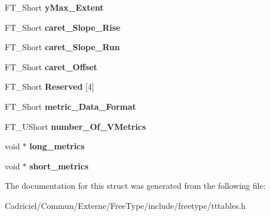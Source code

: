 \begin{DoxyCompactItemize}
\item 
F\+T\+\_\+\+Short {\bfseries y\+Max\+\_\+\+Extent}\hypertarget{struct_t_t___vert_header___af6927e95c1dfbe90c2e76b1eef521d53}{}\label{struct_t_t___vert_header___af6927e95c1dfbe90c2e76b1eef521d53}

\item 
F\+T\+\_\+\+Short {\bfseries caret\+\_\+\+Slope\+\_\+\+Rise}\hypertarget{struct_t_t___vert_header___a3218533a7d8ac5a8ebd70a970cbdbbcc}{}\label{struct_t_t___vert_header___a3218533a7d8ac5a8ebd70a970cbdbbcc}

\item 
F\+T\+\_\+\+Short {\bfseries caret\+\_\+\+Slope\+\_\+\+Run}\hypertarget{struct_t_t___vert_header___a98ff91b532d827440f7140d3071d473d}{}\label{struct_t_t___vert_header___a98ff91b532d827440f7140d3071d473d}

\item 
F\+T\+\_\+\+Short {\bfseries caret\+\_\+\+Offset}\hypertarget{struct_t_t___vert_header___a89ff9369f61dc5b770cde0eda954d402}{}\label{struct_t_t___vert_header___a89ff9369f61dc5b770cde0eda954d402}

\item 
F\+T\+\_\+\+Short {\bfseries Reserved} \mbox{[}4\mbox{]}\hypertarget{struct_t_t___vert_header___a54930b56bb8be0a8eb22753a9242fc5f}{}\label{struct_t_t___vert_header___a54930b56bb8be0a8eb22753a9242fc5f}

\item 
F\+T\+\_\+\+Short {\bfseries metric\+\_\+\+Data\+\_\+\+Format}\hypertarget{struct_t_t___vert_header___aa7c3983f62f7bf736eaaaae684b65dd7}{}\label{struct_t_t___vert_header___aa7c3983f62f7bf736eaaaae684b65dd7}

\item 
F\+T\+\_\+\+U\+Short {\bfseries number\+\_\+\+Of\+\_\+\+V\+Metrics}\hypertarget{struct_t_t___vert_header___a4ca6fe9cdd12fbc9a1129c4fbf6bddd1}{}\label{struct_t_t___vert_header___a4ca6fe9cdd12fbc9a1129c4fbf6bddd1}

\item 
void $\ast$ {\bfseries long\+\_\+metrics}\hypertarget{struct_t_t___vert_header___ac789245d0d6243bc965ad43702bdc671}{}\label{struct_t_t___vert_header___ac789245d0d6243bc965ad43702bdc671}

\item 
void $\ast$ {\bfseries short\+\_\+metrics}\hypertarget{struct_t_t___vert_header___ad5e875c19a02b0f6777db1c122bff2f3}{}\label{struct_t_t___vert_header___ad5e875c19a02b0f6777db1c122bff2f3}

\end{DoxyCompactItemize}


The documentation for this struct was generated from the following file\+:\begin{DoxyCompactItemize}
\item 
Cadriciel/\+Commun/\+Externe/\+Free\+Type/include/freetype/tttables.\+h\end{DoxyCompactItemize}
